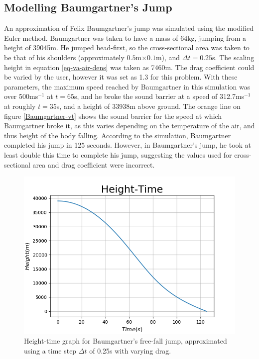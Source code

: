 \documentclass[twocolumn,prl,nobalancelastpage,aps,10pt]{revtex4-1}
\begin{document}
\subsection{Modelling Baumgartner's Jump}

An approximation of Felix Baumgartner's jump was simulated using the modified Euler method. Baumgartner was taken to have a mass of 64kg, jumping from  a height of 39045m. He jumped head-first, so the cross-sectional area was taken to be that of his shoulders (approximately $0.5$m$\times0.1$m), and $\Delta t=0.25$s. The scaling height in equation \ref{eq-va-air-dens} was taken as 7460m. The drag coefficient could be varied by the user, however it was set as 1.3 for this problem. With these parameters, the maximum speed reached by Baumgartner in this simulation was over 500ms$^{-1}$ at $t=65$s, and he broke the sound barrier at a speed of 312.7ms$^{-1}$ at roughly $t=35$s, and a height of 33938m above ground. The orange line on figure \ref{Baumgartner-vt} shows the sound barrier for the speed at which Baumgartner broke it, as this varies depending on the temperature of the air, and thus height of the body falling. According to the simulation, Baumgartner completed his jump in 125 seconds. However, in Baumgartner's jump, he took at least double this time to complete his jump, suggesting the values used for cross-sectional area and drag coefficient were incorrect. 
\begin{figure}[H]
	\includegraphics*[width=0.96\linewidth,clip]{Baumgartner-ht}
	\caption{Height-time graph for Baumgartner's free-fall jump, approximated using a time step $\Delta t$ of 0.25s with varying drag.}\label{Baumgartner-ht}
\end{figure}
\end{document}
